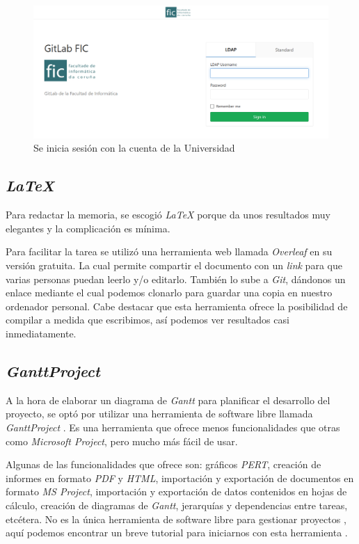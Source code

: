 \begin{figure}[tbp]
\centering
\includegraphics[scale=0.5]{figures/gitfic.png}
\caption{Se inicia sesión con la cuenta de la Universidad}
\end{figure}

\subsection{\textit{LaTeX}}
Para redactar la memoria, se escogió \textit{LaTeX} porque da unos resultados muy elegantes y la complicación es mínima.

Para facilitar la tarea se utilizó una herramienta web llamada \textit{Overleaf} \cite{noauthor_overleaf_nodate} en su versión gratuita. La cual permite compartir el documento con un \textit{link} para que varias personas puedan leerlo y/o editarlo. También lo sube a \textit{Git}, dándonos un enlace mediante el cual podemos clonarlo para guardar una copia en nuestro ordenador personal. Cabe destacar que esta herramienta ofrece la posibilidad de compilar a medida que escribimos, así podemos ver resultados casi inmediatamente.

\subsection{\textit{GanttProject}}
A la hora de elaborar un diagrama de \textit{Gantt} para planificar el desarrollo del proyecto, se optó por utilizar una herramienta de software libre llamada \textit{GanttProject} \cite{noauthor_ganttproject_nodate}. Es una herramienta que ofrece menos funcionalidades que otras como \textit{Microsoft Project}, pero mucho más fácil de usar.

Algunas de las funcionalidades que ofrece son: gráficos \textit{PERT}, creación de informes en formato \textit{PDF} y \textit{HTML}, importación y exportación de documentos en formato \textit{MS Project}, importación y exportación de datos contenidos en hojas de cálculo, creación de diagramas de \textit{Gantt}, jerarquías y dependencias entre tareas, etcétera.
No es la única herramienta de software libre para gestionar proyectos \cite{ruben_alcaraz_3_2012}, aquí podemos encontrar un breve tutorial para iniciarnos con esta herramienta \cite{dmitry_barashev_ganttproject_2011}.